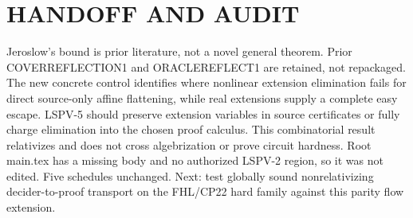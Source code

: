 \documentclass{article}
\begin{document}
\section{HANDOFF AND AUDIT}
Jeroslow's bound is prior literature, not a novel general theorem. Prior COVERREFLECTION1 and ORACLEREFLECT1 are retained, not repackaged. The new concrete control identifies where nonlinear extension elimination fails for direct source-only affine flattening, while real extensions supply a complete easy escape. LSPV-5 should preserve extension variables in source certificates or fully charge elimination into the chosen proof calculus. This combinatorial result relativizes and does not cross algebrization or prove circuit hardness. Root main.tex has a missing body and no authorized LSPV-2 region, so it was not edited. Five schedules unchanged. Next: test globally sound nonrelativizing decider-to-proof transport on the FHL/CP22 hard family against this parity flow extension.
\end{document}
